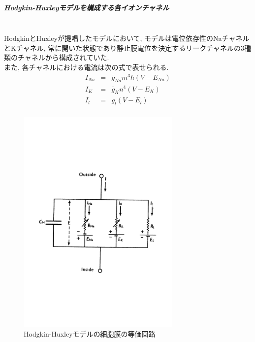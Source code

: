 \subparagraph{Hodgkin-Huxleyモデルを構成する各イオンチャネル}~\\
HodgkinとHuxleyが提唱したモデルにおいて, モデルは電位依存性のNaチャネルとKチャネル,
常に開いた状態であり静止膜電位を決定するリークチャネルの3種類のチャネルから構成されていた.\\
また, 各チャネルにおける電流は次の式で表せられる.\\
\begin{eqnarray}
  I_{Na} & = & \overline{g}_{Na}m^3h(V - E_{Na})\\
  I_{K} & = & \overline{g}_{K}n^4(V - E_{K})\\
  I_{l} & =& g_l(V - E_l)\\
\end{eqnarray}

\begin{figure}[htb]
 \begin{center}
    \includegraphics[width=8cm]{./images/hh-circuit.pdf}
    \caption{Hodgkin-Huxleyモデルの細胞膜の等価回路}
    \label{fig:hh-circuit}
 \end{center}
\end{figure}

